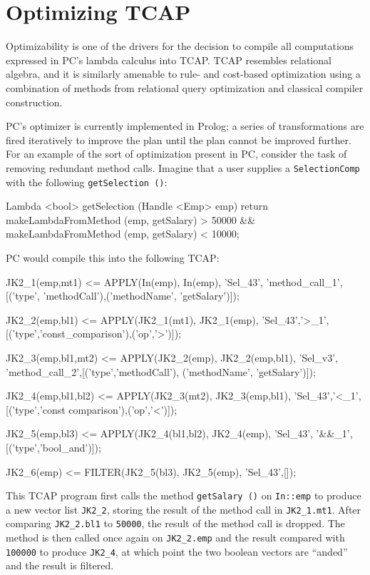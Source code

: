 
\section{Optimizing TCAP}
\label{sec:optimizer}

Optimizability is one of the drivers for
the decision to compile all computations expressed in PC's lambda calculus into TCAP.  
TCAP resembles relational algebra, and it is similarly amenable to rule- and cost-based optimization
using a combination of methods from relational query optimization and classical compiler construction.

PC's optimizer is currently implemented
in Prolog; a series of transformations are fired iteratively to improve the plan until the plan cannot be improved further.
For an example of the sort of optimization present in PC, consider the task of removing redundant method calls.  Imagine that a user
supplies a \texttt{SelectionComp} with the following \texttt{getSelection ()}:

\begin{codesmall} 
Lambda <bool> getSelection (Handle  <Emp> emp) {
   return makeLambdaFromMethod
      (emp, getSalary) > 50000 &&
      makeLambdaFromMethod (emp, getSalary) < 10000;
}	
\end{codesmall}

\noindent PC would compile this into the following TCAP:

\begin{codesmall}
JK2_1(emp,mt1) <= APPLY(In(emp), In(emp), 'Sel_43',
'method_call_1',[('type', 'methodCall'),('methodName',
'getSalary')]);

JK2_2(emp,bl1) <= APPLY(JK2_1(mt1), JK2_1(emp), 
'Sel_43','>_1',[('type','const_comparison'),('op','>')]);

JK2_3(emp,bl1,mt2) <= APPLY(JK2_2(emp), JK2_2(emp,bl1), 
'Sel_v3', 'method_call_2',[('type','methodCall'), 
('methodName', 'getSalary')]);

JK2_4(emp,bl1,bl2) <= APPLY(JK2_3(mt2), JK2_3(emp,bl1), 
'Sel_43','<_1',[('type','const comparison'),('op','<')]);

JK2_5(emp,bl3) <= APPLY(JK2_4(bl1,bl2), JK2_4(emp), 
'Sel_43', '&&_1',[('type','bool_and')]);

JK2_6(emp) <= FILTER(JK2_5(bl3), JK2_5(emp), 'Sel_43',[]);
\end{codesmall}

\noindent
This TCAP program first calls the method \texttt{getSalary ()} on \texttt{In::emp} to produce a new vector list \texttt{JK2\_2}, storing the result
of the method call in \texttt{JK2\_1.mt1}.  After comparing \texttt{JK2\_2.bl1} to \texttt{50000}, the result of the method call is dropped.
The method is then called once again on \texttt{JK2\_2.emp} and the result compared with \texttt{100000} to produce \texttt{JK2\_4}, at which 
point the two boolean vectors are ``anded'' and the result is filtered.

